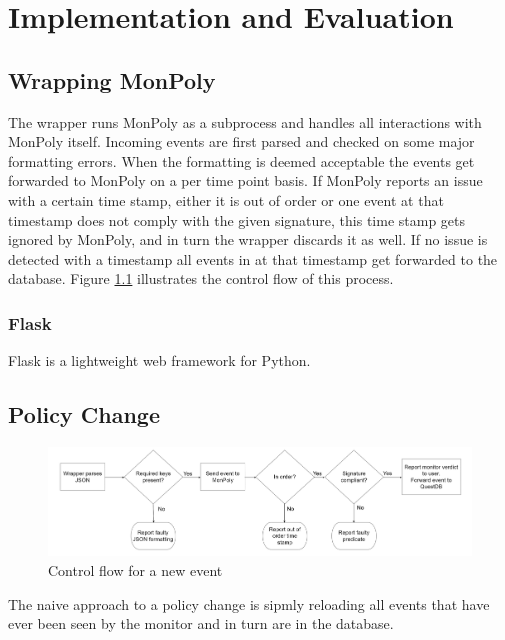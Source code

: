 \chapter{Implementation and Evaluation}

\section{Wrapping MonPoly}

The wrapper runs MonPoly as a subprocess and handles all interactions with MonPoly itself.
Incoming events are first parsed and checked on some major formatting errors.
When the formatting is deemed acceptable the events get forwarded to MonPoly on a per time point basis.
If MonPoly reports an issue with a certain time stamp, either it is out of order or one event at that timestamp does not comply with the given signature, this time stamp gets ignored by MonPoly, and in turn the wrapper discards it as well.
If no issue is detected with a timestamp all events in at that timestamp get forwarded to the database.
Figure \ref{fig:flowchart} illustrates the control flow of this process.

\subsection{Flask}
Flask \cite{Flask} is a lightweight web framework for Python.




\section{Policy Change}
% 

\begin{figure}
    \label{fig:flowchart}
    \centering
    \includegraphics[width=\linewidth]{diagrams/flowchart-2.png}
    \caption{Control flow for a new event}
\end{figure}

The naive approach to a policy change is sipmly reloading all events that have ever been seen by the monitor and in turn are in the database.

